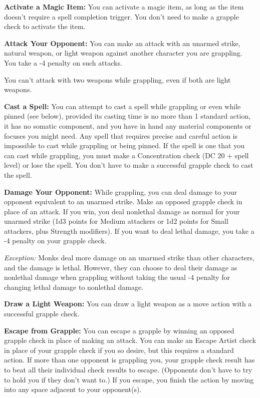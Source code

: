 \textbf{Activate a Magic Item:} You can activate a magic item, as long as the item 
doesn't require a spell completion trigger. You don't need to make a grapple check 
to activate the item.

\textbf{Attack Your Opponent:} You can make an attack with an unarmed strike, natural 
weapon, or light weapon against another character you are grappling. You take a 
-4 penalty on such attacks.

You can't attack with two weapons while grappling, even if both are light weapons.

\textbf{Cast a Spell:} You can attempt to cast a spell while grappling or even 
while pinned (see below), provided its casting time is no more than 1 standard 
action, it has no somatic component, and you have in hand any material components 
or focuses you might need. Any spell that requires precise and careful action\textit{ 
}is impossible to cast while grappling or being pinned. If the spell is one that 
you can cast while grappling, you must make a Concentration check (DC 20 + spell 
level) or lose the spell. You don't have to make a successful grapple check to 
cast the spell.

\textbf{Damage Your Opponent:} While grappling, you can deal damage to your opponent 
equivalent to an unarmed strike. Make an opposed grapple check in place of an attack. 
If you win, you deal nonlethal damage as normal for your unarmed strike (1d3 points 
for Medium attackers or 1d2 points for Small attackers, plus Strength modifiers). 
If you want to deal lethal damage, you take a -4 penalty on your grapple check.

\textit{Exception:} Monks deal more damage on an unarmed strike than other characters, 
and the damage is lethal. However, they can choose to deal their damage as nonlethal 
damage when grappling without taking the usual -4 penalty for changing lethal damage 
to nonlethal damage.

\textbf{Draw a Light Weapon:} You can draw a light weapon as a move action with 
a successful grapple check.

\textbf{Escape from Grapple:} You can escape a grapple by winning an opposed grapple 
check in place of making an attack. You can make an Escape Artist check in place 
of your grapple check if you so desire, but this requires a standard action. If 
more than one opponent is grappling you, your grapple check result has to beat 
all their individual check results to escape. (Opponents don't have to try to hold 
you if they don't want to.) If you escape, you finish the action by moving into 
any space adjacent to your opponent(s).

